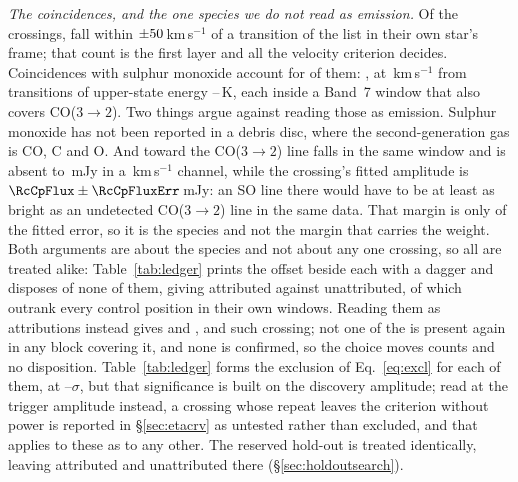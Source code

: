 \emph{The coincidences, and the one species we do not read as emission.} Of
the \NCross{} crossings, \MkNCoinc{} fall within
$\pm50$\,km\,s$^{-1}$ of a transition of the list in their own
star's frame; that count is the first layer and all the velocity criterion
decides. Coincidences with sulphur monoxide account for \MkNSODecide{} of them:
\MkSOStars, at \MkSODvList\,km\,s$^{-1}$ from transitions of upper-state
energy \MkSOEuLo--\MkSOEuHi\,K, each inside a Band~7 window that also covers
CO($3\to2$). Two things argue against reading those as emission.
Sulphur monoxide has not been reported in a debris disc, where the
second-generation gas is CO, C and O. And toward \FrCpStar{} the CO($3\to2$)
line falls in the same window and is absent to \FrCpCoLimMJy\,mJy in a
\FrCpCoChanKms\,km\,s$^{-1}$ channel, while the crossing's fitted amplitude is
$\RcCpFlux\pm\RcCpFluxErr$\,mJy: an SO line there would have to be at
least as bright as an undetected CO($3\to2$) line in the same data. That
margin is only \RqAmpSigmaCp{} of the fitted error, so it is the species and
not the margin that carries the weight. Both arguments are about the species
and
not about any one crossing, so all \MkNSODecide{} are treated alike:
Table~\ref{tab:ledger} prints the offset beside each with a dagger and
disposes of none of them, giving \MkAttr{} attributed against \MkUnattr{}
unattributed, of which \MkRankLeadWord{} outrank every control position in
their own windows.
Reading them as attributions instead gives \MkAttrAlt{} and \MkUnattrAlt,
and \MkRankLeadAlt{} such crossing; not one of the \MkNSODecide{} is present
again in any block covering it, and none is confirmed, so the choice moves
counts and no disposition. Table~\ref{tab:ledger} forms the exclusion of
Eq.~\ref{eq:excl} for each of them, at
\MkAttrExclLo--\MkAttrExclHi$\sigma$, but that significance is built on the
discovery amplitude; read at the trigger amplitude instead, a crossing whose
repeat leaves the criterion without power is reported in
\S\ref{sec:etacrv} as untested rather than excluded, and that applies to
these as to any other. The reserved hold-out is treated identically, leaving
\HoNAttr{}
attributed and \HoNUnattr{} unattributed there (\S\ref{sec:holdoutsearch}).

